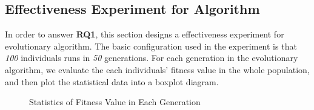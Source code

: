 \subsection{Effectiveness Experiment for Algorithm}
%
In order to answer \textbf{RQ1}, this section designs a effectiveness experiment
for evolutionary algorithm. The basic configuration used in the experiment is
that \emph{100} individuals runs in \emph{50} generations. For each generation
in the evolutionary algorithm, we evaluate the each individuals' fitness value
in the whole population, and then plot the statistical data into a boxplot
diagram.

\begin{figure}[!h]
  \centering



  \caption{Statistics of Fitness Value in Each Generation}
  \label{fig:pj}
\end{figure}

